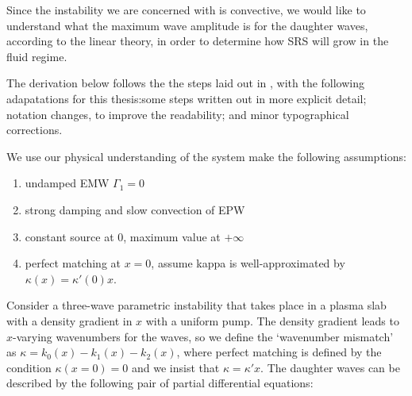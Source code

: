 

Since the instability we are concerned with is convective, we would like to understand what the maximum wave amplitude is for the daughter waves, according to the linear theory, in order to determine how SRS will grow in the fluid regime.

The derivation below follows the the steps laid out in \citet{Nishikawa1976}, with the following adapatations for this thesis:some steps written out in more explicit detail; notation changes, to improve the readability; and minor typographical corrections. 

We use our physical understanding of the system make the following assumptions:
\begin{enumerate}
	\item undamped EMW $\Gamma_1 = 0$
	\item strong damping and slow convection of EPW
	\item constant source at 0, maximum value at $+\infty$
	\item perfect matching at $x=0$, assume kappa is well-approximated by 
	$\kappa(x) = \kappa'(0)x$.
\end{enumerate}

Consider a three-wave parametric instability that takes place in a plasma slab with a density gradient in $x$ with a uniform pump. The density gradient leads to $x$-varying wavenumbers for the waves, so we define the `wavenumber mismatch' as $\kappa = k_0(x) - k_1(x) - k_2(x)$, where perfect matching is defined by the condition $\kappa(x=0) = 0$ and we insist that $\kappa = \kappa' x$. The daughter waves can be described by the following pair of partial differential equations:

